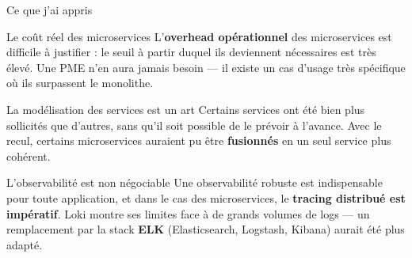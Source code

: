\documentclass[aspectratio=169]{beamer}
\begin{document}
\begin{frame}{Ce que j'ai appris}

  \begin{block}{\faBalanceScale\quad Le coût réel des microservices}
    \small L'\textbf{overhead opérationnel} des microservices est difficile à justifier :
    le seuil à partir duquel ils deviennent nécessaires est très élevé. Une PME n'en
    aura jamais besoin — il existe un cas d'usage très spécifique où ils surpassent
    le monolithe.
  \end{block}

  \vspace{0.35em}

  \begin{block}{\faPuzzlePiece\quad La modélisation des services est un art}
    \small Certains services ont été bien plus sollicités que d'autres, sans qu'il soit
    possible de le prévoir à l'avance. Avec le recul, certains microservices auraient
    pu être \textbf{fusionnés} en un seul service plus cohérent.
  \end{block}

  \vspace{0.35em}

  \begin{block}{\faEye\quad L'observabilité est non négociable}
    \small Une observabilité robuste est indispensable pour toute application, et dans
    le cas des microservices, le \textbf{tracing distribué est impératif}. Loki montre
    ses limites face à de grands volumes de logs — un remplacement par la stack
    \textbf{ELK} (Elasticsearch, Logstash, Kibana) aurait été plus adapté.
  \end{block}

\end{frame}
\end{document}
